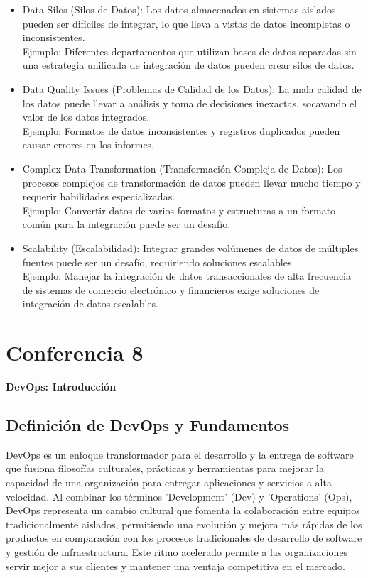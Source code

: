 \documentclass[12pt]{book}
\begin{document}
\begin{itemize}
    \item Data Silos (Silos de Datos): Los datos almacenados en sistemas aislados pueden ser difíciles de integrar, lo que lleva a vistas de datos incompletas o inconsistentes.\\
    Ejemplo: Diferentes departamentos que utilizan bases de datos separadas sin una estrategia unificada de integración de datos pueden crear silos de datos. 
    \item Data Quality Issues (Problemas de Calidad de los Datos): La mala calidad de los datos puede llevar a análisis y toma de decisiones inexactas, socavando el valor de los datos integrados.\\
    Ejemplo: Formatos de datos inconsistentes y registros duplicados pueden causar errores en los informes.
    \item Complex Data Transformation (Transformación Compleja de Datos): Los procesos complejos de transformación de datos pueden llevar mucho tiempo y requerir habilidades especializadas.\\
    Ejemplo: Convertir datos de varios formatos y estructuras a un formato común para la integración puede ser un desafío.
    \item Scalability (Escalabilidad): Integrar grandes volúmenes de datos de múltiples fuentes puede ser un desafío, requiriendo soluciones escalables.\\
    Ejemplo: Manejar la integración de datos transaccionales de alta frecuencia de sistemas de comercio electrónico y financieros exige soluciones de integración de datos escalables.
\end{itemize}

\chapter{Conferencia 8}
\normalfont\LARGE \textbf{DevOps: Introducción}
\normalfont\small\\


\section{Definición de DevOps y Fundamentos}

DevOps es un enfoque transformador para el desarrollo y la entrega de software que fusiona filosofías culturales, prácticas y herramientas para mejorar la capacidad de una organización para entregar aplicaciones y servicios a alta velocidad. Al combinar los términos 'Development' (Dev) y 'Operations' (Ops), DevOps representa un cambio cultural que fomenta la colaboración entre equipos tradicionalmente aislados, permitiendo una evolución y mejora más rápidas de los productos en comparación con los procesos tradicionales de desarrollo de software y gestión de infraestructura. Este ritmo acelerado permite a las organizaciones servir mejor a sus clientes y mantener una ventaja competitiva en el mercado.
\end{document}
